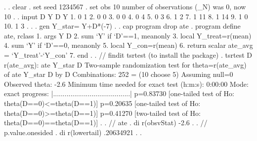 . 
. clear
{\smallskip}
. set seed 1234567
{\smallskip}
. set obs 10
number of observations (_N) was 0, now 10
{\smallskip}
. 
. input D Y
{\smallskip}
             D          Y
  1. 0 1 
  2. 0 0 
  3. 0 0 
  4. 0 4 
  5. 0 3 
  6. 1 2 
  7. 1 11 
  8. 1 14 
  9. 1 0 
 10. 1 3 
{\smallskip}
. 
. 
. gen Y_star= Y+D*(-7)
{\smallskip}
. 
. cap program drop ate
{\smallskip}
. program define ate, rclass
  1.         args Y D
  2.         sum `Y' if `D'==1, meanonly
  3.         local Y_treat=r(mean)
  4.         sum `Y' if `D'==0, meanonly
  5.         local Y_con=r(mean)
  6.         return scalar ate_avg = `Y_treat'-`Y_con'
  7. end
{\smallskip}
. 
. // findit tsrtest (to install the package)
. tsrtest D r(ate_avg): ate Y_star D
Two-sample randomization test for theta=r(ate_avg) of ate Y_star D by D
{\smallskip}
Combinations:   252 = (10 choose 5)
Assuming null=0
Observed theta: -2.6
{\smallskip}
Minimum time needed for exact test (h:m:s):  0:00:00
Mode: exact
{\smallskip}
progress: |........................................|
{\smallskip}
 p=0.83730 [one-tailed test of Ho:  theta(D==0)<=theta(D==1)]
 p=0.20635 [one-tailed test of Ho:  theta(D==0)>=theta(D==1)]
 p=0.41270 [two-tailed test of Ho:  theta(D==0)==theta(D==1)]
{\smallskip}
. 
. // ate
. di r(obsvStat)       
-2.6
{\smallskip}
. 
. // p.value.onesided
. di r(lowertail)   
.20634921
{\smallskip}
. 
. 
